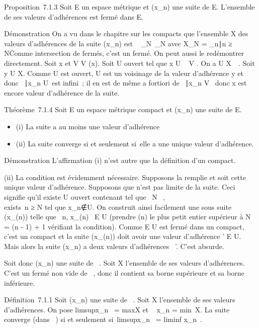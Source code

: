 \documentclass[]{article}
\begin{document}
Proposition~7.1.3 Soit E un espace métrique et (x_n) une suite
de E. L'ensemble de ses valeurs d'adhérences est fermé dans E.

Démonstration On a vu dans le chapitre sur les compacts que l'ensemble X
des valeurs d'adhérences de la suite (x_n) est
\⋂ ~
_N\in{}~\overlineX_N avec X_N =
\x_n∣n ≥
N\. Comme intersection de fermés, c'est un fermé. On
peut aussi le redémontrer directement. Soit x
\in\overlineX et V \in V (x). Soit U ouvert tel que x \in U
\subset~ V . On a U \bigcap X\neq~\varnothing~. Soit y \in U \bigcap X. Comme U
est ouvert, U est un voisinage de la valeur d'adhérence y et donc
\n \in {}~∣x_n \in
U\ est infini~; il en est de même a fortiori de
\n \in {}~∣x_n \in V
\, donc x est encore valeur d'adhérence de la suite.

Théorème~7.1.4 Soit E un espace métrique compact et (x_n) une
suite de E.

\begin{itemize}
\itemsep1pt\parskip0pt
\item
  (i) La suite a au moins une valeur d'adhérence
\item
  (ii) La suite converge si et seulement si~elle a une unique valeur
  d'adhérence.
\end{itemize}

Démonstration L'affirmation (i) n'est autre que la définition d'un
compact.

(ii) La condition est évidemment nécessaire. Supposons la remplie et
soit \ell cette unique valeur d'adhérence. Supposons que \ell n'est pas limite
de la suite. Ceci signifie qu'il existe U ouvert contenant \ell tel que
\forall~N \in {}~, \\exists~n ≥ N tel
que x_n∉U. On construit ainsi
facilement une sous suite (x_\phi(n)) telle que
\forall~n, x_\phi(n)~ \in E \diagdown U (prendre \phi(n) le
plus petit entier supérieur à N = \phi(n - 1) + 1 vérifiant la condition).
Comme E \diagdown U est fermé dans un compact, c'est un compact et la suite
(x_\phi(n)) doit avoir une valeur d'adhérence \ell' \in E \diagdown U. Mais
alors la suite (x_n) a deux valeurs d'adhérences
\ell\neq~\ell'. C'est absurde.

Soit donc (x_n) une suite de \overline{}~.
Soit X l'ensemble de ses valeurs d'adhérences. C'est un fermé non vide
de \overline{}~, donc il contient sa borne supérieure
et sa borne inférieure.

Définition~7.1.1 Soit (x_n) une suite de
\overline{}~. Soit X l'ensemble de ses valeurs
d'adhérences. On pose limsupx_n~
= maxX et \liminf~
x_n = min~X. La suite converge (dans
\overline{}~) si et seulement
si~limsupx_n~
= liminf x_n~.
\end{document}
